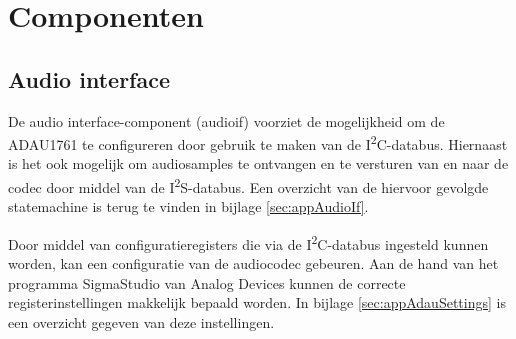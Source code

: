 \chapter{Componenten}

\section{Audio interface}
	
	\par De audio interface-component (audio\textunderscore if) voorziet de mogelijkheid om de ADAU1761 te configureren door gebruik te maken van de I\textsuperscript{2}C-databus. Hiernaast is het ook mogelijk om audiosamples te ontvangen en te versturen van en naar de codec door middel van de I\textsuperscript{2}S-databus. Een overzicht van de hiervoor gevolgde statemachine is terug te vinden in bijlage \ref{sec:appAudioIf}.

	\par Door middel van configuratieregisters die via de I\textsuperscript{2}C-databus ingesteld kunnen worden, kan een configuratie van de audiocodec gebeuren. Aan de hand van het programma SigmaStudio van Analog Devices kunnen de correcte registerinstellingen makkelijk bepaald worden. In bijlage \ref{sec:appAdauSettings} is een overzicht gegeven van deze instellingen.

